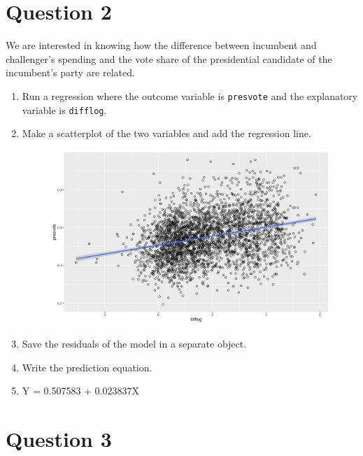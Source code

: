 \documentclass[12pt,letterpaper]{article}
\begin{document}
\section*{Question 2}
\noindent We are interested in knowing how the difference between incumbent and challenger's spending and the vote share of the presidential candidate of the incumbent's party are related.	\vspace{.25cm}
	\begin{enumerate}
		\item Run a regression where the outcome variable is \texttt{presvote} and the explanatory variable is \texttt{difflog}.
		
		\item Make a scatterplot of the two variables and add the regression line. 	\vspace{5cm}
		\begin{figure}
			\includegraphics[width=0.75\linewidth]{sc_plot2.png}
			\label{Fig2}
		\end{figure}
		\item Save the residuals of the model in a separate object.	
		
		\vspace{1cm}
		\item Write the prediction equation.
		\item[]Y = 0.507583 + 0.023837X 
	\end{enumerate}
	
	\newpage	
\section*{Question 3}
\end{document}
